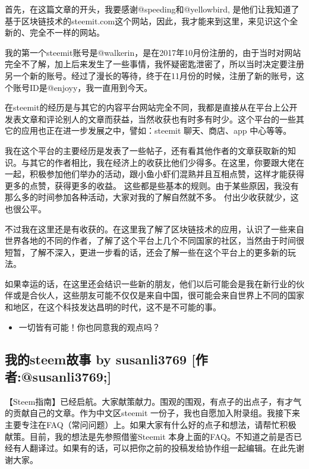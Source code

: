 \documentclass[]{ctexbook}
\providecommand{\tightlist}{%
  \setlength{\itemsep}{0pt}\setlength{\parskip}{0pt}}
\begin{document}
首先，在这篇文章的开头，我要感谢@speeding和@yellowbird, 是他们让我知道了基于区块链技术的steemit.com这个网站，因此，我才能来到这里，来见识这个全新的、完全不一样的网站。

我的第一个steemit账号是@walkerin，是在2017年10月份注册的，由于当时对网站完全不了解，加上后来发生了一些事情，我怀疑密匙泄密了，所以当时决定要注册另一个新的账号。经过了漫长的等待，终于在11月份的时候，注册了新的账号，这个账号ID是@enjoyy，我一直用到今天。

在steemit的经历是与其它的内容平台网站完全不同，我都是直接从在平台上公开发表文章和评论别人的文章而获益，当然收获也有时多有时少。这个平台的一些其它的应用也正在进一步发展之中，譬如：steemit 聊天、商店、app 中心等等。

我在这个平台的主要经历是发表了一些帖子，还有看其他作者的文章获取新的知识。与其它的作者相比，我在经济上的收获比他们少得多。在这里，你要跟大佬在一起，积极参加他们举办的活动，跟小鱼小虾们混熟并且互相点赞，这样才能获得更多的点赞，获得更多的收益。
这些都是些基本的规则。由于某些原因，我没有那么多的时间参加各种活动，大家对我的了解自然就不多。
付出少收获就少，这也很公平。

不过我在这里还是有收获的。在这里我了解了区块链技术的应用，认识了一些来自世界各地的不同的作者，了解了这个平台上几个不同国家的社区，当然由于时间很短暂，了解不深入，更进一步看的话，还会了解一些在这个平台上的更多新的玩法。

如果幸运的话，在这里还会结识一些新的朋友，他们以后可能会是我在新行业的伙伴或是合伙人，这些朋友可能不仅仅是来自中国，很可能会来自世界上不同的国家和地区，在这个科技发达昌明的时代，这不是不可能的事。

\begin{itemize}
\tightlist
\item
  一切皆有可能！你也同意我的观点吗？
\end{itemize}

\hypertarget{steem-by-susanli3769-susanli3769}{%
\subsection{我的steem故事 by susanli3769 {[}作者:@susanli3769;{]}}\label{steem-by-susanli3769-susanli3769}}

【Steem指南】已经启航。大家献策献力。围观的围观，有点子的出点子，有才气的贡献自己的文章。作为中文区steemit 一份子，我也自愿加入附录组。我接下来主要专注在FAQ（常问问题）上。如果大家有什么好的点子和想法，请帮忙积极献策。目前，我的想法是先参照借鉴Steemit 本身上面的FAQ。不知道之前是否已经有人翻译过。如果有的话，可以把你之前的投稿发给协作组一起编辑。在此先谢谢大家。
\end{document}
